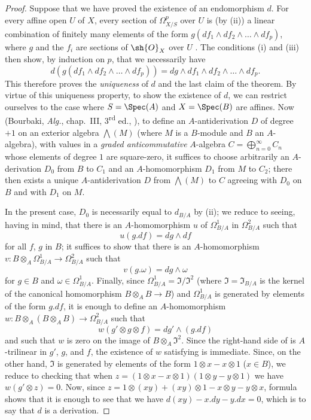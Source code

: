 \begin{proof}
Suppose that we have proved the existence of an endomorphism $d$.
For every affine open $U$ of $X$, every section of $\Omega_{X/S}^p$ over $U$ is (by \rm{(ii)}) a linear combination of finitely many elements of the form $g(df_1 \wedge df_2 \wedge \dots \wedge df_p)$, where $g$ and the $f_i$ are sections of $\sh{O}_X$ over $U$ .
The conditions \rm{(i)} and \rm{(iii)} then show, by induction on $p$, that we necessarily have
\[
  \label{IV.16.6.2.2}
  d(g(df_1 \wedge df_2 \wedge \dots \wedge df_p)) = dg \wedge df_1 \wedge df_2 \wedge \dots \wedge df_p.
  \tag{16.6.2.2}
\]
This therefore proves the \emph{uniqueness} of $d$ and the last claim of the theorem.
By virtue of this uniqueness property, to show the existence of $d$, we can restrict ourselves to the case where $S = \Spec(A)$ and $X = \Spec(B)$ are affines.
Now (Bourbaki, \emph{Alg.}, chap.~III, 3\textsuperscript{rd} ed., ), to define an $A$-antiderivation $D$ of degree $+1$ on an exterior algebra $\bigwedge(M)$ (where $M$ is a $B$-module and $B$ an $A$-algebra), with values in a \emph{graded anticommutative} $A$-algebra $C = \bigoplus_{n=0}^\infty C_n$ whose elements of degree $1$ are square-zero, it suffices to choose arbitrarily an $A$-derivation $D_0$ from $B$ to $C_1$ and an $A$-homomorphism $D_1$ from $M$ to $C_2$;
there then exists a unique $A$-antiderivation $D$ from $\bigwedge(M)$ to $C$ agreeing with $D_0$ on $B$ and with $D_1$ on $M$. 

In the present case, $D_0$ is necessarily equal to $d_{B/A}$ by \rm{(ii)};
we reduce to seeing, having  in mind, that there is an $A$-homomorphism $u$ of $\Omega_{B/A}^1$ in $\Omega_{B/A}^2$ such that 
\[
  \label{IV.16.6.2.3}
  u(g.df) = dg \wedge df
  \tag{16.6.2.3}
\]
for all $f$, $g$ in $B$;
it suffices to show that there is an $A$-homomorphism $v:B \otimes_A \Omega_{B/A}^1 \to \Omega_{B/A}^2$ such that
\[
  \label{IV.16.6.2.4}
  v(g.\omega) = dg \wedge \omega
  \tag{16.6.2.4}
\]
for $g \in B$ and $\omega \in \Omega_{B/A}^1$.
Finally, since $\Omega_{B/A}^1 = \mathfrak{I}/\mathfrak{I}^2$ (where $\mathfrak{I} = \mathfrak{I}_{B/A}$ is the kernel of the canonical homomorphism $B \otimes_A B \to B$) and $\Omega_{B/A}^1$ is generated by elements of the form $g.df$, it is enough to define an $A$-homomorphism $w: B \otimes_A (B \otimes_A B) \to \Omega_{B/A}^2$ such that
\[
  \label{IV.16.6.2.5}
  w(g' \otimes g \otimes f) = dg' \wedge (g.df)
  \tag{16.6.2.5}
\]
and such that $w$ is zero on the image of $B \otimes_A \mathfrak{I}^2$.
Since the right-hand side of  is $A$-trilinear in $g'$, $g$, and $f$, the existence of $w$ satisfying  is immediate.
Since, on the other hand, $\mathfrak{I}$ is generated by elements of the form $1 \otimes x - x \otimes 1$ ($x \in B$), we reduce to checking that when $z = (1 \otimes x - x \otimes 1)(1 \otimes y - y \otimes 1)$ we have $w(g'\otimes z) = 0$. 
Now, since $z = 1 \otimes (xy) + (xy) \otimes 1 - x \otimes y - y \otimes x$, formula  shows that it is 
enough to see that we have $d(xy) - x.dy - y.dx = 0$, which is to say that $d$ is a derivation.


\end{proof}
